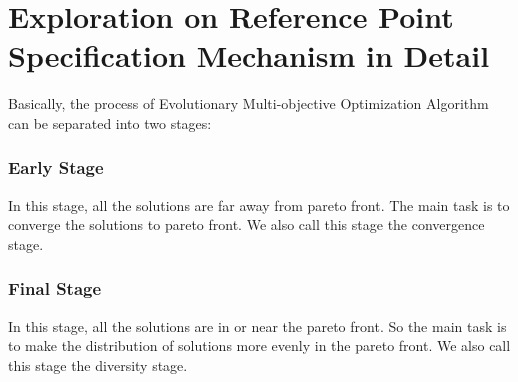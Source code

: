 \documentclass[conference]{IEEEtran}
\begin{document}
\section{Exploration on Reference Point Specification Mechanism in Detail}
Basically, the process of Evolutionary Multi-objective Optimization Algorithm can be separated into
two stages:
\subsubsection{Early Stage} In this stage, 
all the solutions are far away from pareto front.
The main task is to converge the solutions to pareto front.
We also call this stage the convergence stage.
\subsubsection{Final Stage} In this stage,
all the solutions are in or near the pareto front.
So the main task is to make the distribution of solutions more evenly in the pareto front.
We also call this stage the diversity stage.

%
% 
\end{document}
